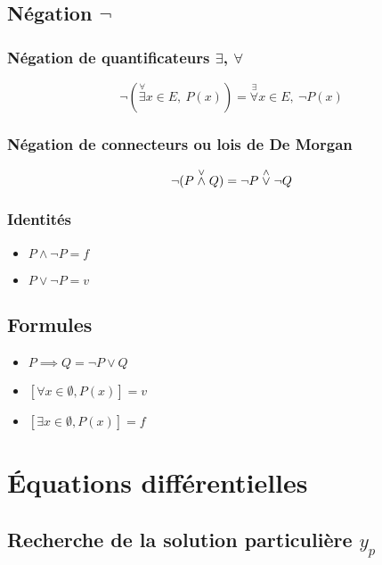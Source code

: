 \documentclass{article}
\begin{document}
\subsection{Négation $\lnot$}

\newcommand{\forallexists}{\stackrel{\forall}{\exists}}
\newcommand{\existsforall}{\stackrel{\exists}{\forall}}

\subsubsection{Négation de quantificateurs $\exists$, $\forall$}

\[
	\lnot(\forallexists x \in E,\ P(x)) = \existsforall x \in E,\ \lnot P(x)
\] 


\subsubsection{Négation de connecteurs ou lois de De Morgan}

\[
	\lnot(P \stackrel{\lor}{\land} Q) = \lnot P \stackrel{\land}{\lor} \lnot Q
\] 

\subsubsection{Identités}
\begin{itemize}
	\item $P \land \lnot P = f$
	\item $P \lor \lnot P = v$
\end{itemize}

\subsection{Formules}

\begin{itemize}
	\item $P \implies Q = \lnot P \lor Q$
	\item $[\forall x \in \emptyset, P(x)] = v$
	\item $[\exists x \in \emptyset, P(x)] = f$
\end{itemize}

\newpage
\section{Équations différentielles}

\subsection{Recherche de la solution particulière $y_p$}
\end{document}
